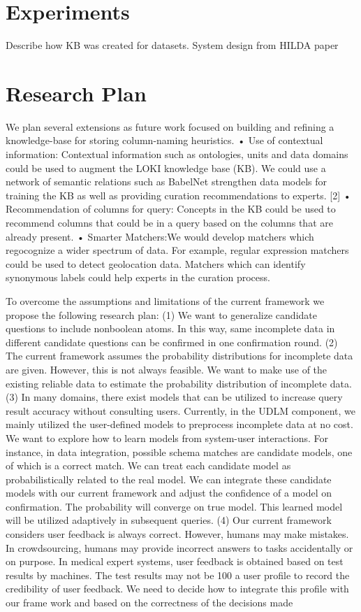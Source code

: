 \documentclass{vldb}
\begin{document}
\section{Experiments}
Describe how KB was created for datasets. System design from HILDA paper

\section{Research Plan}
We plan several extensions as future work focused on building and
refining a knowledge-base for storing column-naming heuristics.
• Use of contextual information: Contextual information
such as ontologies, units and data domains could be used to augment
the LOKI knowledge base (KB). We could use a network of
semantic relations such as BabelNet strengthen data models for
training the KB as well as providing curation recommendations
to experts. [2] • Recommendation of columns for query: Concepts
in the KB could be used to recommend columns that could be
in a query based on the columns that are already present. • Smarter
Matchers:We would develop matchers which regocognize a wider
spectrum of data. For example, regular expression matchers could
be used to detect geolocation data. Matchers which can identify
synonymous labels could help experts in the curation process.

To overcome the assumptions and limitations of the current
framework we propose the following research plan: (1)
We want to generalize candidate questions to include nonboolean
atoms. In this way, same incomplete data in different
candidate questions can be confirmed in one confirmation
round. (2) The current framework assumes the probability
distributions for incomplete data are given. However,
this is not always feasible. We want to make use of the existing
reliable data to estimate the probability distribution of
incomplete data. (3) In many domains, there exist models
that can be utilized to increase query result accuracy without
consulting users. Currently, in the UDLM component,
we mainly utilized the user-defined models to preprocess incomplete
data at no cost. We want to explore how to learn
models from system-user interactions. For instance, in data
integration, possible schema matches are candidate models,
one of which is a correct match. We can treat each candidate
model as probabilistically related to the real model. We can
integrate these candidate models with our current framework
and adjust the confidence of a model on confirmation.
The probability will converge on true model. This learned
model will be utilized adaptively in subsequent queries. (4)
Our current framework considers user feedback is always
correct. However, humans may make mistakes. In crowdsourcing,
humans may provide incorrect answers to tasks
accidentally or on purpose. In medical expert systems, user
feedback is obtained based on test results by machines. The
test results may not be 100%
a user profile to record the credibility of user feedback. We
need to decide how to integrate this profile with our frame work and based on the correctness of the decisions made
\end{document}
